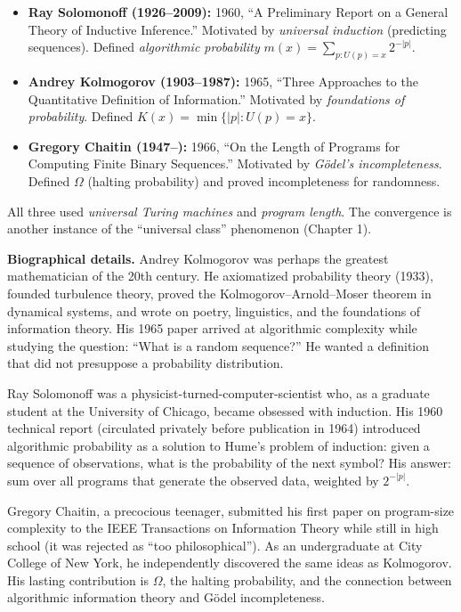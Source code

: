 \begin{itemize}
\item \textbf{Ray Solomonoff (1926--2009):} 1960, ``A Preliminary Report on a General Theory of Inductive Inference.'' Motivated by \emph{universal induction} (predicting sequences). Defined \emph{algorithmic probability} $m(x) = \sum_{p: U(p)=x} 2^{-|p|}$.
\item \textbf{Andrey Kolmogorov (1903--1987):} 1965, ``Three Approaches to the Quantitative Definition of Information.'' Motivated by \emph{foundations of probability}. Defined $K(x) = \min \{ |p| : U(p) = x \}$.
\item \textbf{Gregory Chaitin (1947--):} 1966, ``On the Length of Programs for Computing Finite Binary Sequences.'' Motivated by \emph{G\"odel's incompleteness}. Defined $\Omega$ (halting probability) and proved incompleteness for randomness.
\end{itemize}
All three used \emph{universal Turing machines} and \emph{program length}. The convergence is another instance of the ``universal class'' phenomenon (Chapter 1).

\textbf{Biographical details.} Andrey Kolmogorov was perhaps the greatest mathematician of the 20th century. He axiomatized probability theory (1933), founded turbulence theory, proved the Kolmogorov--Arnold--Moser theorem in dynamical systems, and wrote on poetry, linguistics, and the foundations of information theory. His 1965 paper arrived at algorithmic complexity while studying the question: ``What is a random sequence?'' He wanted a definition that did not presuppose a probability distribution.

Ray Solomonoff was a physicist-turned-computer-scientist who, as a graduate student at the University of Chicago, became obsessed with induction. His 1960 technical report (circulated privately before publication in 1964) introduced algorithmic probability as a solution to Hume's problem of induction: given a sequence of observations, what is the probability of the next symbol? His answer: sum over all programs that generate the observed data, weighted by $2^{-|p|}$.

Gregory Chaitin, a precocious teenager, submitted his first paper on program-size complexity to the IEEE Transactions on Information Theory while still in high school (it was rejected as ``too philosophical''). As an undergraduate at City College of New York, he independently discovered the same ideas as Kolmogorov. His lasting contribution is $\Omega$, the halting probability, and the connection between algorithmic information theory and G\"odel incompleteness.

